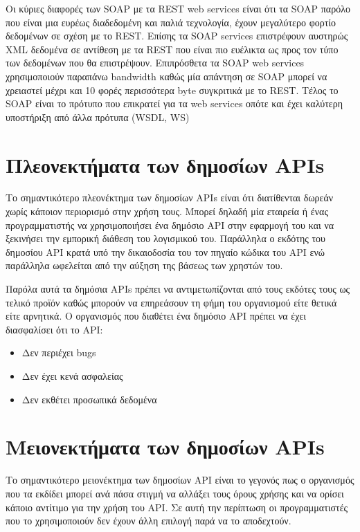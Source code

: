 \documentclass[oneside, 12pt]{book}
\begin{document}
Οι κύριες διαφορές των SOAP με τα REST web services είναι ότι τα SOAP 
παρόλο που είναι μια ευρέως διαδεδομένη και παλιά τεχνολογία,  έχουν 
μεγαλύτερο φορτίο δεδομένων σε σχέση με το REST. Επίσης τα SOAP 
services επιστρέφουν αυστηρώς XML δεδομένα σε αντίθεση με τα REST που 
είναι πιο ευέλικτα ως προς τον τύπο των δεδομένων που θα επιστρέψουν. 
Επιπρόσθετα τα SOAP web services χρησιμοποιούν παραπάνω bandwidth 
καθώς μία απάντηση σε SOAP μπορεί να χρειαστεί μέχρι και 10 φορές 
περισσότερα byte συγκριτικά με το REST. Τέλος το SOAP είναι το 
πρότυπο που επικρατεί για τα web services οπότε και έχει καλύτερη 
υποστήριξη από άλλα πρότυπα (WSDL, WS)~\cite{wagh2012comparative}

\section{Πλεονεκτήματα των δημοσίων APIs}
Το σημαντικότερο πλεονέκτημα των δημοσίων APIs είναι ότι διατίθενται 
δωρεάν χωρίς κάποιον περιορισμό στην χρήση τους. Μπορεί δηλαδή μία 
εταιρεία ή ένας προγραμματιστής να χρησιμοποιήσει ένα δημόσιο API στην 
εφαρμογή του και να ξεκινήσει την εμπορική διάθεση του λογισμικού του.
Παράλληλα ο εκδότης του δημοσίου API κρατά υπό την δικαιοδοσία του τον 
πηγαίο κώδικα του API ενώ παράλληλα ωφελείται από την αύξηση της 
βάσεως των χρηστών του.

Παρόλα αυτά τα δημόσια APIs πρέπει να αντιμετωπίζονται από τους εκδότες 
τους ως τελικό προϊόν καθώς μπορούν να επηρεάσουν τη φήμη του 
οργανισμού είτε θετικά είτε αρνητικά.
Ο οργανισμός που διαθέτει ένα δημόσιο API πρέπει να έχει διασφαλίσει 
ότι το API:
\begin{itemize} %
\item Δεν περιέχει bugs 
\item Δεν έχει κενά ασφαλείας
\item Δεν εκθέτει προσωπικά δεδομένα
\end{itemize}

\section{Μειονεκτήματα των δημοσίων APIs}
Το σημαντικότερο μειονέκτημα των δημοσίων API είναι το γεγονός πως ο 
οργανισμός που τα εκδίδει μπορεί ανά πάσα στιγμή να αλλάξει τους όρους 
χρήσης και να ορίσει κάποιο αντίτιμο για την χρήση του API. Σε αυτή 
την περίπτωση οι προγραμματιστές που το χρησιμοποιούν δεν έχουν άλλη 
επιλογή παρά να το αποδεχτούν.
\end{document}
